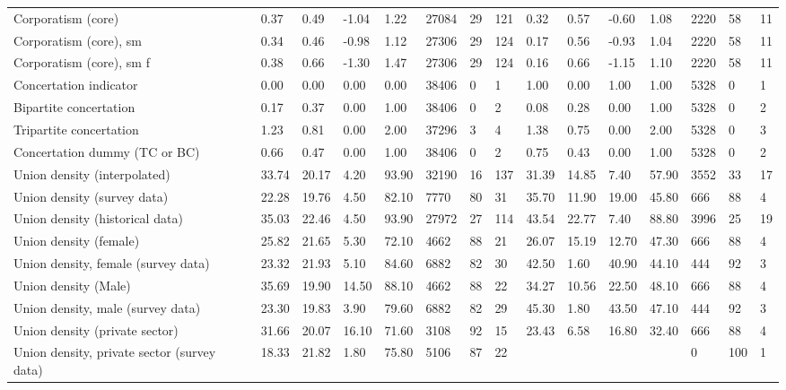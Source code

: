 \begin{longtable}{lllllllllllllll}
Corporatism (core) & 0.37 & 0.49 & -1.04 & 1.22 & 27084 & 29 & 121 & 0.32 & 0.57 & -0.60 & 1.08 & 2220 & 58 & 11\\
\addlinespace
Corporatism (core), sm & 0.34 & 0.46 & -0.98 & 1.12 & 27306 & 29 & 124 & 0.17 & 0.56 & -0.93 & 1.04 & 2220 & 58 & 11\\
Corporatism (core), sm f & 0.38 & 0.66 & -1.30 & 1.47 & 27306 & 29 & 124 & 0.16 & 0.66 & -1.15 & 1.10 & 2220 & 58 & 11\\
Concertation indicator & 0.00 & 0.00 & 0.00 & 0.00 & 38406 & 0 & 1 & 1.00 & 0.00 & 1.00 & 1.00 & 5328 & 0 & 1\\
Bipartite concertation & 0.17 & 0.37 & 0.00 & 1.00 & 38406 & 0 & 2 & 0.08 & 0.28 & 0.00 & 1.00 & 5328 & 0 & 2\\
Tripartite concertation & 1.23 & 0.81 & 0.00 & 2.00 & 37296 & 3 & 4 & 1.38 & 0.75 & 0.00 & 2.00 & 5328 & 0 & 3\\
\addlinespace
Concertation dummy (TC or BC) & 0.66 & 0.47 & 0.00 & 1.00 & 38406 & 0 & 2 & 0.75 & 0.43 & 0.00 & 1.00 & 5328 & 0 & 2\\
Union density (interpolated) & 33.74 & 20.17 & 4.20 & 93.90 & 32190 & 16 & 137 & 31.39 & 14.85 & 7.40 & 57.90 & 3552 & 33 & 17\\
Union density (survey data) & 22.28 & 19.76 & 4.50 & 82.10 & 7770 & 80 & 31 & 35.70 & 11.90 & 19.00 & 45.80 & 666 & 88 & 4\\
Union density (historical data) & 35.03 & 22.46 & 4.50 & 93.90 & 27972 & 27 & 114 & 43.54 & 22.77 & 7.40 & 88.80 & 3996 & 25 & 19\\
Union density (female) & 25.82 & 21.65 & 5.30 & 72.10 & 4662 & 88 & 21 & 26.07 & 15.19 & 12.70 & 47.30 & 666 & 88 & 4\\
\addlinespace
Union density, female (survey data) & 23.32 & 21.93 & 5.10 & 84.60 & 6882 & 82 & 30 & 42.50 & 1.60 & 40.90 & 44.10 & 444 & 92 & 3\\
Union density (Male) & 35.69 & 19.90 & 14.50 & 88.10 & 4662 & 88 & 22 & 34.27 & 10.56 & 22.50 & 48.10 & 666 & 88 & 4\\
Union density, male (survey data) & 23.30 & 19.83 & 3.90 & 79.60 & 6882 & 82 & 29 & 45.30 & 1.80 & 43.50 & 47.10 & 444 & 92 & 3\\
Union density (private sector) & 31.66 & 20.07 & 16.10 & 71.60 & 3108 & 92 & 15 & 23.43 & 6.58 & 16.80 & 32.40 & 666 & 88 & 4\\
Union density, private sector (survey data) & 18.33 & 21.82 & 1.80 & 75.80 & 5106 & 87 & 22 &  &  &  &  & 0 & 100 & 1\\

\end{longtable}
